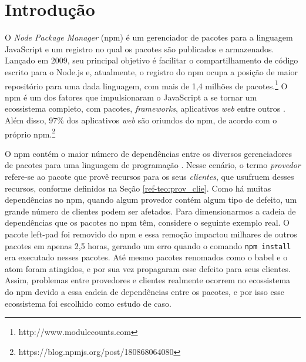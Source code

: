 \chapter{Introdução}
\label{cap:introducao}

O \textit{Node Package Manager} (\textsf{npm}) é um gerenciador de pacotes para a linguagem \textsf{JavaScript} e um registro no qual os pacotes são publicados e armazenados. Lançado em 2009, seu principal objetivo é facilitar o compartilhamento de código escrito para o \textsf{Node.js} e, atualmente, o registro do \textsf{npm} ocupa a posição de maior repositório para uma dada linguagem, com mais de 1,4 milhões de pacotes.\footnote{http://www.modulecounts.com} O \textsf{npm} é um dos fatores que impulsionaram o \textsf{JavaScript} a se tornar um ecossistema completo, com pacotes, \textit{frameworks}, aplicativos \textit{web} entre outros \cite{introduction:npm}. Além disso, 97\% dos aplicativos \textit{web} são oriundos do \textsf{npm}, de acordo com o próprio \textsf{npm}.\footnote{https://blog.npmjs.org/post/180868064080}

O \textsf{npm} contém o maior número de dependências entre os diversos gerenciadores de pacotes para uma linguagem de programação \cite{teorical_reference:npm_2}. Nesse cenário, o termo \textit{provedor} refere-se ao pacote que provê recursos para os seus \textit{clientes}, que usufruem desses recursos, conforme definidos na Seção \ref{ref-teo:prov_clie}. Como há muitas dependências no \textsf{npm}, quando algum provedor contém algum tipo de defeito, um grande número de clientes podem ser afetados. Para dimensionarmos a cadeia de dependências que os pacotes no \textsf{npm} têm, considere o seguinte exemplo real. O pacote \textsf{left-pad} foi removido do \textsf{npm} e essa remoção impactou milhares de outros pacotes em apenas 2,5 horas, gerando um erro quando o comando \texttt{npm install} era executado nesses pacotes. Até mesmo pacotes renomados como o \textsf{babel} e o \textsf{atom} foram atingidos, e por sua vez propagaram esse defeito para seus clientes. Assim, problemas entre provedores e clientes realmente ocorrem no ecossistema do \textsf{npm} devido a essa cadeia de dependências entre os pacotes, e por isso esse ecossistema foi escolhido como estudo de caso.

